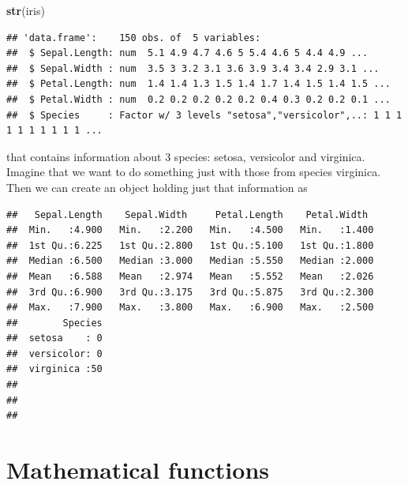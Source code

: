 \documentclass[
]{article}
\newenvironment{Shaded}{\begin{snugshade}}{\end{snugshade}}
\newcommand{\FloatTok}[1]{\textcolor[rgb]{0.00,0.00,0.81}{#1}}
\newcommand{\FunctionTok}[1]{\textcolor[rgb]{0.13,0.29,0.53}{\textbf{#1}}}
\newcommand{\NormalTok}[1]{#1}
\newcommand{\OtherTok}[1]{\textcolor[rgb]{0.56,0.35,0.01}{#1}}
\newcommand{\SpecialCharTok}[1]{\textcolor[rgb]{0.81,0.36,0.00}{\textbf{#1}}}
\newcommand{\StringTok}[1]{\textcolor[rgb]{0.31,0.60,0.02}{#1}}
\begin{document}
\begin{Shaded}
\begin{Highlighting}[]
\FunctionTok{str}\NormalTok{(iris)}
\end{Highlighting}
\end{Shaded}

\begin{verbatim}
## 'data.frame':    150 obs. of  5 variables:
##  $ Sepal.Length: num  5.1 4.9 4.7 4.6 5 5.4 4.6 5 4.4 4.9 ...
##  $ Sepal.Width : num  3.5 3 3.2 3.1 3.6 3.9 3.4 3.4 2.9 3.1 ...
##  $ Petal.Length: num  1.4 1.4 1.3 1.5 1.4 1.7 1.4 1.5 1.4 1.5 ...
##  $ Petal.Width : num  0.2 0.2 0.2 0.2 0.2 0.4 0.3 0.2 0.2 0.1 ...
##  $ Species     : Factor w/ 3 levels "setosa","versicolor",..: 1 1 1 1 1 1 1 1 1 1 ...
\end{verbatim}

that contains information about 3 species: setosa, versicolor and
virginica. Imagine that we want to do something just with those from
species virginica. Then we can create an object holding just that
information as

\begin{Shaded}
\end{Shaded}

\begin{verbatim}
##   Sepal.Length    Sepal.Width     Petal.Length    Petal.Width   
##  Min.   :4.900   Min.   :2.200   Min.   :4.500   Min.   :1.400  
##  1st Qu.:6.225   1st Qu.:2.800   1st Qu.:5.100   1st Qu.:1.800  
##  Median :6.500   Median :3.000   Median :5.550   Median :2.000  
##  Mean   :6.588   Mean   :2.974   Mean   :5.552   Mean   :2.026  
##  3rd Qu.:6.900   3rd Qu.:3.175   3rd Qu.:5.875   3rd Qu.:2.300  
##  Max.   :7.900   Max.   :3.800   Max.   :6.900   Max.   :2.500  
##        Species  
##  setosa    : 0  
##  versicolor: 0  
##  virginica :50  
##                 
##                 
## 
\end{verbatim}

\section{Mathematical functions}\label{mathematical-functions}
\end{document}
